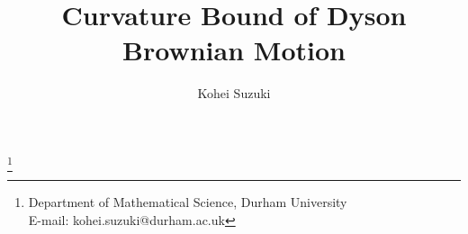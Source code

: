 \documentclass[11pt,letterpaper]{amsart}
\renewcommand{\1}{\mathbf 1}
\numberwithin{equation}{section}
\theoremstyle{plain}
\theoremstyle{definition}
\theoremstyle{remark}
\begin{document}
\title[Curvature bound of Dyson Brownian Motion]{Curvature Bound of Dyson Brownian Motion}

\author[K.~Suzuki]{Kohei Suzuki}
\address{Department of Mathematical Science, Durham University, Science Laboratories, South Road, DH1 3LE, United Kingdom}
\thanks{\hspace{-5.5mm} Department of Mathematical Science, Durham University 
\\
\hspace{2.0mm} E-mail: kohei.suzuki@durham.ac.uk
}


\end{document}
